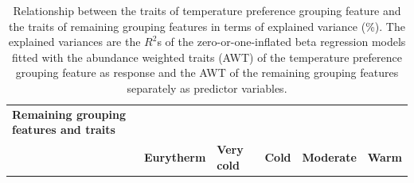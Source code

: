 \begin{table}[hp!]

\label{Table C.4}

\caption{Relationship between the traits of temperature preference grouping feature and the traits of remaining grouping features in terms of explained variance (\%). The explained variances are the $R^2$s of the zero-or-one-inflated beta regression models fitted with the abundance weighted traits (AWT) of the temperature preference grouping feature as response and the AWT of the remaining grouping features separately as predictor variables.}

\centering

\begin{threeparttable}

\begin{tabular}{>{\centering\arraybackslash}m{3.6cm}>{\centering\arraybackslash}m{1.3cm}>{\centering\arraybackslash}m{1.4cm}>{\centering\arraybackslash}m{1.0cm}>{\centering\arraybackslash}m{1.3cm}>{\centering\arraybackslash}m{1.0cm}}

\toprule
\textbf{Remaining grouping features and traits} & \multicolumn{5}{c}{\textbf{Traits of temperature preference grouping feature}}\\
 & \textbf{Eurytherm} & \textbf{Very cold} & \textbf{Cold} & \textbf{Moderate} & \textbf{Warm}\\

\midrule


\end{tabular}
\end{threeparttable}
\end{table}
